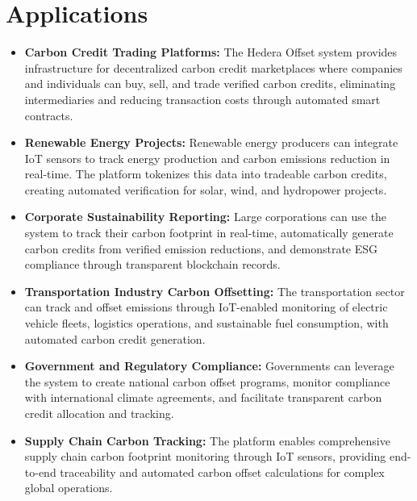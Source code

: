 \documentclass[oneside,a4paper,12pt]{book}
\begin{document}
\section{Applications}
\begin{itemize}
    \item \textbf{Carbon Credit Trading Platforms:} The Hedera Offset system provides infrastructure for decentralized carbon credit marketplaces where companies and individuals can buy, sell, and trade verified carbon credits, eliminating intermediaries and reducing transaction costs through automated smart contracts.
    
    \item \textbf{Renewable Energy Projects:} Renewable energy producers can integrate IoT sensors to track energy production and carbon emissions reduction in real-time. The platform tokenizes this data into tradeable carbon credits, creating automated verification for solar, wind, and hydropower projects.
    
    \item \textbf{Corporate Sustainability Reporting:} Large corporations can use the system to track their carbon footprint in real-time, automatically generate carbon credits from verified emission reductions, and demonstrate ESG compliance through transparent blockchain records.
    
    \item \textbf{Transportation Industry Carbon Offsetting:} The transportation sector can track and offset emissions through IoT-enabled monitoring of electric vehicle fleets, logistics operations, and sustainable fuel consumption, with automated carbon credit generation.
    
    \item \textbf{Government and Regulatory Compliance:} Governments can leverage the system to create national carbon offset programs, monitor compliance with international climate agreements, and facilitate transparent carbon credit allocation and tracking.
    
    \item \textbf{Supply Chain Carbon Tracking:} The platform enables comprehensive supply chain carbon footprint monitoring through IoT sensors, providing end-to-end traceability and automated carbon offset calculations for complex global operations.
\end{itemize}
\end{document}
